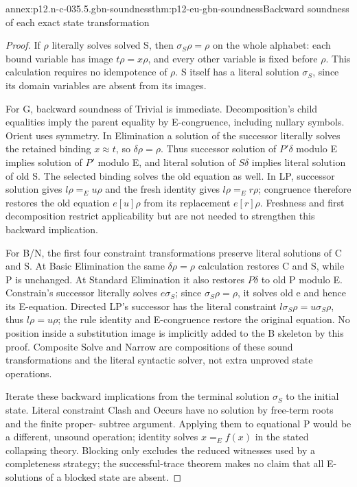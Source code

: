 \begin{annexitem}{annex:p12.n-c-035.5.gbn-soundness}{thm:p12-eu-gbn-soundness}{Backward soundness of each exact state transformation}
\begin{proof}
If \(\rho\) literally solves solved S, then
\(\sigma_S\rho=\rho\) on the whole alphabet: each bound variable
has image \(t\rho=x\rho\), and every other variable is fixed
before \(\rho\). This calculation requires no idempotence of \(\rho\).
S itself has a literal solution \(\sigma_S\), since its domain
variables are absent from its images.

For G, backward soundness of Trivial is immediate. Decomposition's
child equalities imply the parent equality by E-congruence, including
nullary symbols. Orient uses symmetry. In Elimination a solution of
the successor literally solves the retained binding \(x\approx t\),
so \(\delta\rho=\rho\). Thus successor solution of \(P'\delta\)
modulo E implies solution of \(P'\) modulo E, and literal solution
of \(S\delta\) implies literal solution of old S. The selected
binding solves the old equation as well. In LP, successor solution
gives \(l\rho=_E u\rho\) and the fresh identity gives
\(l\rho=_E r\rho\); congruence therefore restores the old
equation \(e[u]\rho\) from its replacement \(e[r]\rho\).
Freshness and first decomposition restrict applicability but are not
needed to strengthen this backward implication.

For B/N, the first four constraint transformations preserve literal
solutions of C and S. At Basic Elimination the same
\(\delta\rho=\rho\) calculation restores C and S, while P
is unchanged. At Standard Elimination it also restores \(P\delta\)
to old P modulo E. Constrain's successor literally solves
\(e\sigma_S\); since \(\sigma_S\rho=\rho\), it solves
old e and hence its E-equation. Directed LP's successor has the
literal constraint \(l\sigma_S\rho=u\sigma_S\rho\), thus
\(l\rho=u\rho\); the rule identity and E-congruence restore
the original equation. No position inside a substitution image is
implicitly added to the B skeleton by this proof. Composite Solve
and Narrow are compositions of these sound transformations and the
literal syntactic solver, not extra unproved state operations.

Iterate these backward implications from the terminal solution
\(\sigma_S\) to the initial state. Literal constraint Clash and
Occurs have no solution by free-term roots and the finite proper-
subtree argument. Applying them to equational P would be a different,
unsound operation; identity solves \(x=_E f(x)\) in the stated
collapsing theory. Blocking only excludes the reduced witnesses used
by a completeness strategy; the successful-trace theorem makes no
claim that all E-solutions of a blocked state are absent.
\end{proof}
\end{annexitem}

